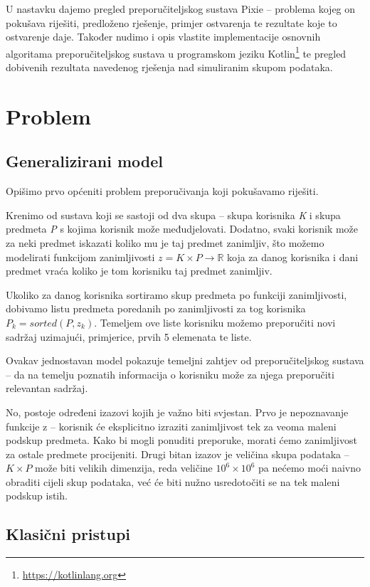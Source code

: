 \documentclass[times, utf8, seminar]{fer}
\begin{document}
U nastavku dajemo pregled preporučiteljskog sustava Pixie -- problema kojeg on pokušava riješiti, predloženo rješenje, primjer ostvarenja te rezultate koje to ostvarenje daje. Također nudimo i opis vlastite implementacije osnovnih algoritama preporučiteljskog sustava u programskom jeziku Kotlin\footnote{\url{https://kotlinlang.org}} te pregled dobivenih rezultata navedenog rješenja nad simuliranim skupom podataka.

\chapter{Problem}

\section{Generalizirani model}
Opišimo prvo općeniti problem preporučivanja koji pokušavamo riješiti. 

Krenimo od sustava koji se sastoji od dva skupa -- skupa korisnika \textit{K} i skupa predmeta \textit{P} s kojima korisnik može međudjelovati. Dodatno, svaki korisnik može za neki predmet iskazati koliko mu je taj predmet zanimljiv, što možemo modelirati funkcijom zanimljivosti $z = K \times P \to \mathbb{R}$ koja za danog korisnika i dani predmet vraća koliko je tom korisniku taj predmet zanimljiv.

Ukoliko za danog korisnika sortiramo skup predmeta po funkciji zanimljivosti, dobivamo listu predmeta poredanih po zanimljivosti za tog korisnika $P_k = sorted(P, z_k)$. Temeljem ove liste korisniku možemo preporučiti novi sadržaj uzimajući, primjerice, prvih 5 elemenata te liste.

Ovakav jednostavan model pokazuje temeljni zahtjev od preporučiteljskog sustava -- da na temelju poznatih informacija o korisniku može za njega preporučiti relevantan sadržaj. 

No, postoje određeni izazovi kojih je važno biti svjestan. Prvo je nepoznavanje funkcije z -- korisnik će eksplicitno izraziti zanimljivost tek za veoma maleni podskup predmeta. Kako bi mogli ponuditi preporuke, morati ćemo zanimljivost za ostale predmete procijeniti. Drugi bitan izazov je veličina skupa podataka -- $K \times P$ može biti velikih dimenzija, reda veličine $10^6 \times 10^6$ pa nećemo moći naivno obraditi cijeli skup podataka, već će biti nužno usredotočiti se na tek maleni podskup istih.

\section{Klasični pristupi}
\end{document}
